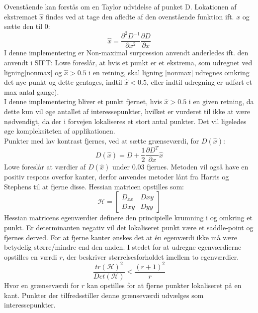 Ovenstående kan forstås om en Taylor udvidelse af punket D.
Lokationen af ekstremaet $\hat{x}$ findes ved at tage den afledte af den ovenstående funktion ift. $x$ og sætte den til 0:
\begin{equation}
\hat{x}= \dfrac{\partial^2 D^{-1}}{\partial x^2}\dfrac{\partial D}{\partial x}
\label{xhat}
\end{equation}
I denne implementering er Non-maximal surpression anvendt anderledes ift. den anvendt i SIFT: Lowe foreslår, at hvis et punkt er et ekstrema, som udregnet ved ligning\ref{nonmax} og $\hat{x} > 0.5$ i en retning, skal ligning \eqref{nonmax} udregnes omkring det nye punkt og dette gentages, indtil $\hat{x} < 0.5$, eller indtil udregning er udført et max antal gange).
\\
I denne implementering bliver et punkt fjernet, hvis $\hat{x} > 0.5$ i en given retning, da dette kun vil øge antallet af interessepunkter, hvilket er vurderet til ikke at være nødvendigt, da der i forvejen lokaliseres et stort antal punkter. Det vil ligeledes øge kompleksiteten af applikationen.
\\
Punkter med lav kontrast fjernes, ved at sætte grænseværdi, for $D(\hat{x})$:
\begin{equation}
D(\hat{x})=D+\dfrac{1}{2}\dfrac{\partial D^T}{\partial x}\hat{x}
\label{dxhat}
\end{equation}
Lowe foreslår at værdier af $D(\hat{x})$ under 0.03 fjernes. Metoden vil også have en positiv respons overfor kanter, derfor anvendes metoder lånt fra Harris og Stephens \cite{harris} til at fjerne disse. Hessian matricen opstilles som:
\begin{equation}
\mathcal{H} =
\begin{bmatrix}
D_{xx} & D{xy} \\
D{xy} & D{yy}
\end{bmatrix}
\end{equation}
Hessian matricens egenværdier definere den principielle krumning i og omkring et punkt. Er determinanten negativ vil det lokaliseret punkt være et saddle-point og fjernes derved. For at fjerne kanter ønskes det at én egenværdi ikke må være betydelig større/mindre end den anden. I stedet for at udregne egenværdierne opstilles en værdi $r$, der beskriver størrelsesforholdet imellem to egenværdier.
\begin{equation}
\dfrac{tr(\mathcal{H})^2}{Det(\mathcal{H})}<\dfrac{(r+1)^2}{r}
\label{rval}
\end{equation}
Hvor en grænseværdi for $r$ kan opstilles for at fjerne punkter lokaliseret på en kant. Punkter der tilfredsstiller denne grænseværdi udvælges som interessepunkter. 
